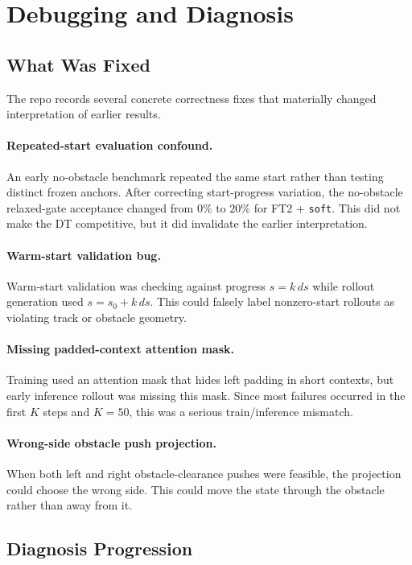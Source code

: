 \section{Debugging and Diagnosis}

\subsection{What Was Fixed}

The repo records several concrete correctness fixes that materially changed interpretation of earlier results.

\paragraph{Repeated-start evaluation confound.}
An early no-obstacle benchmark repeated the same start rather than testing distinct frozen anchors. After correcting start-progress variation, the no-obstacle relaxed-gate acceptance changed from $0\%$ to $20\%$ for FT2 + \texttt{soft}. This did not make the DT competitive, but it did invalidate the earlier interpretation.

\paragraph{Warm-start validation bug.}
Warm-start validation was checking against progress $s=k\,ds$ while rollout generation used $s=s_0 + k\,ds$. This could falsely label nonzero-start rollouts as violating track or obstacle geometry.

\paragraph{Missing padded-context attention mask.}
Training used an attention mask that hides left padding in short contexts, but early inference rollout was missing this mask. Since most failures occurred in the first $K$ steps and $K=50$, this was a serious train/inference mismatch.

\paragraph{Wrong-side obstacle push projection.}
When both left and right obstacle-clearance pushes were feasible, the projection could choose the wrong side. This could move the state through the obstacle rather than away from it.

\subsection{Diagnosis Progression}

